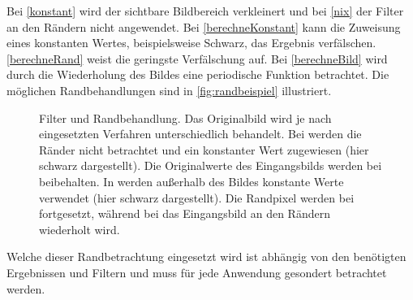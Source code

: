 Bei \autoref{konstant} wird der sichtbare Bildbereich verkleinert und bei \autoref{nix} der Filter an den Rändern nicht
 angewendet. Bei \autoref{berechneKonstant} kann die Zuweisung eines konstanten Wertes, beispielsweise Schwarz, das
 Ergebnis verfälschen. \autoref{berechneRand} weist die geringste Verfälschung auf. Bei \autoref{berechneBild} wird
 durch die Wiederholung des Bildes eine periodische Funktion betrachtet. Die möglichen Randbehandlungen sind in
 \autoref{fig:randbeispiel} illustriert.
\begin{figure}[!ht]
	\centering
	\caption{Filter und Randbehandlung. Das Originalbild  wird je nach eingesetzten
	 Verfahren unterschiedlich behandelt. Bei  werden die Ränder nicht betrachtet und ein
	 konstanter Wert zugewiesen (hier schwarz dargestellt).	Die Originalwerte des Eingangsbilds werden bei
	  beibehalten. In  werden außerhalb des Bildes konstante
	 Werte verwendet (hier schwarz dargestellt). Die Randpixel werden bei  fortgesetzt,
	 während bei  das Eingangsbild an den Rändern wiederholt wird.}
	\label{fig:randbeispiel}
\end{figure}
Welche dieser Randbetrachtung eingesetzt wird ist abhängig von den benötigten Ergebnissen und Filtern und muss für jede
 Anwendung gesondert betrachtet werden.

